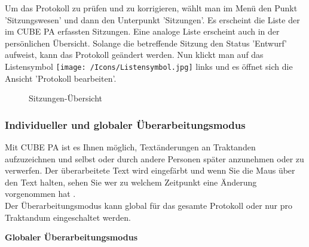 \vspace{\baselineskip}

Um das Protokoll zu prüfen und zu korrigieren, wählt man im Menü den Punkt 'Sitzungswesen' und dann den Unterpunkt 'Sitzungen'. Es erscheint die Liste der im CUBE PA erfassten Sitzungen. Eine analoge Liste erscheint auch in der persönlichen Übersicht. Solange die betreffende Sitzung den Status 'Entwurf' aufweist, kann das Protokoll geändert werden. Nun klickt man auf das Listensymbol \texttt{[image: /Icons/Listensymbol.jpg]}  links und es öffnet sich die Ansicht 'Protokoll bearbeiten'.

\begin{figure}[H]
\caption{Sitzungen-Übersicht}
\end{figure}

\subsubsection{Individueller und globaler Überarbeitungsmodus}

\vspace{\baselineskip}

Mit CUBE PA ist es Ihnen möglich, Textänderungen an Traktanden aufzuzeichnen und selbst oder durch andere Personen später anzunehmen oder zu verwerfen. Der überarbeitete Text wird eingefärbt  und wenn Sie die Maus über den Text halten, sehen Sie wer zu welchem Zeitpunkt eine Änderung vorgenommen hat .\\

Der Überarbeitungsmodus kann global für das gesamte Protokoll oder nur pro Traktandum eingeschaltet werden.

\vspace{\baselineskip}

\textbf{Globaler Überarbeitungsmodus}

